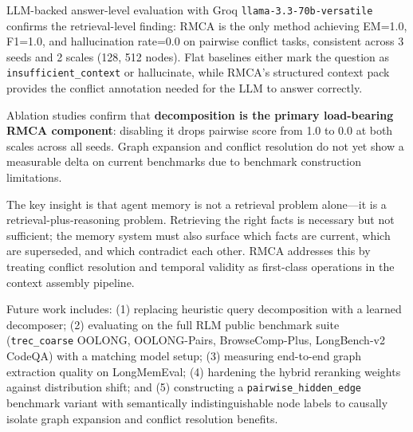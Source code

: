 \documentclass[conference]{IEEEtran}
\begin{document}
LLM-backed answer-level evaluation with Groq \texttt{llama-3.3-70b-versatile} confirms the
retrieval-level finding: RMCA is the only method achieving EM=1.0, F1=1.0, and hallucination
rate=0.0 on pairwise conflict tasks, consistent across 3 seeds and 2 scales (128, 512 nodes).
Flat baselines either mark the question as \texttt{insufficient\_context} or hallucinate,
while RMCA's structured context pack provides the conflict annotation needed for the LLM to
answer correctly.

Ablation studies confirm that \textbf{decomposition is the primary load-bearing RMCA
component}: disabling it drops pairwise score from 1.0 to 0.0 at both scales across all
seeds. Graph expansion and conflict resolution do not yet show a measurable delta on current
benchmarks due to benchmark construction limitations.

The key insight is that agent memory is not a retrieval problem alone---it is a
retrieval-plus-reasoning problem. Retrieving the right facts is necessary but not sufficient;
the memory system must also surface which facts are current, which are superseded, and which
contradict each other. RMCA addresses this by treating conflict resolution and temporal
validity as first-class operations in the context assembly pipeline.

Future work includes: (1) replacing heuristic query decomposition with a learned decomposer;
(2) evaluating on the full RLM public benchmark suite (\texttt{trec\_coarse} OOLONG,
OOLONG-Pairs, BrowseComp-Plus, LongBench-v2 CodeQA) with a matching model setup;
(3) measuring end-to-end graph extraction quality on LongMemEval;
(4) hardening the hybrid reranking weights against distribution shift; and
(5) constructing a \texttt{pairwise\_hidden\_edge} benchmark variant with semantically
indistinguishable node labels to causally isolate graph expansion and conflict resolution
benefits.
\end{document}
